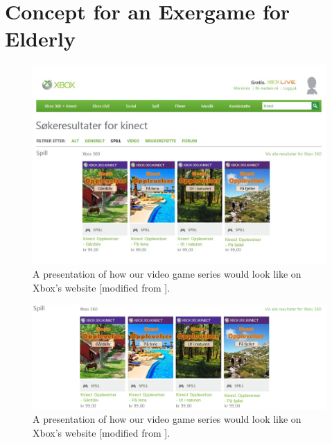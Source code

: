 \chapter{Concept for an Exergame for Elderly}


\begin{figure} [ht!]
\centering
\includegraphics[scale=0.5, angle=90]{SpillXboxNYNY.jpg}
\caption[Presentation of our video game series]{A presentation of how our video game series would look like on Xbox's website [modified from \cite{XboxNettside}].}
\label{videogameseries}
\end{figure}

\begin{figure} [ht!]
\centering
\includegraphics[scale=0.7, angle=90]{SpillXboxNY.png}
\caption[Presentation of our video game series]{A presentation of how our video game series would look like on Xbox's website [modified from \cite{XboxNettside}].}
\label{videogameseries}
\end{figure}


